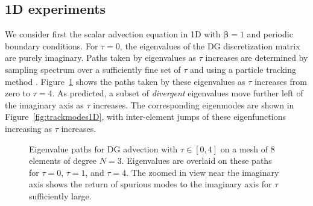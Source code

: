 \documentclass[preprint,10pt]{elsarticle}
\newcommand{\note}[1]{#1}
\begin{document}
\subsection{1D experiments}

We consider first the scalar advection equation in 1D with $\bm{\beta} = 1$ and periodic boundary conditions.  For $\tau = 0$, the eigenvalues of the DG discretization matrix are purely imaginary.  Paths taken by eigenvalues as $\tau$ increases are determined by sampling \note{spectrum} over a sufficiently fine set of $\tau$ and using a particle tracking method \cite{simpletracker}.  Figure~\ref{fig:track1D} shows the paths taken by these eigenvalues as $\tau$ increases from zero to $\tau = 4$.  As predicted, a subset of \emph{divergent} eigenvalues move further left of the imaginary axis as $\tau$ increases.  The corresponding eigenmodes are shown in Figure~\ref{fig:trackmodes1D}, with inter-element jumps of these eigenfunctions increasing as $\tau$ increases.  

\begin{figure}
\centering
{}
\hspace{1em}
\caption{Eigenvalue paths for DG advection with $\tau \in [0,4]$ on a mesh of 8 elements of degree $N=3$.  Eigenvalues are overlaid on these paths for $\tau = 0$, $\tau = 1$, and $\tau = 4$.  The zoomed in view near the imaginary axis shows the return of spurious modes to the imaginary axis for $\tau$ sufficiently large. }
\label{fig:track1D}
\end{figure}
\end{document}
